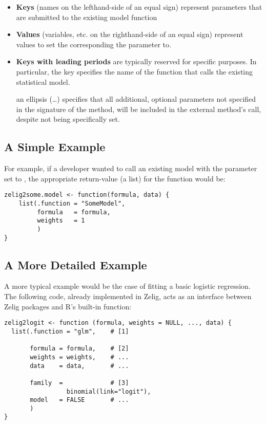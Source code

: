 \begin{itemize}

  \item {\bf Keys} (names on the lefthand-side of an equal sign) represent
        parameters that are submitted to the existing model function

  \item {\bf Values} (variables, etc. on the righthand-side of an equal sign)
        represent values to set the corresponding the parameter to.
        
  \item {\bf Keys with leading periods} are typically reserved for specific
         purposes. In particular, the key 
        specifies the name of the function that calls the existing statistical
        model.
	\item[an ellipsis (\dots)] specifies that all additional, optional parameters not specified in the signature of the  method, will be included in the external method's call, despite not being specifically set.


\end{itemize}

\subsection{A Simple Example}

\noindent For example, if a developer wanted to call an existing model
 with the parameter  set to ,
the appropriate return-value (a list) for the  function would be:


\begin{verbatim}
zelig2some.model <- function(formula, data) {
    list(.function = "SomeModel",
         formula   = formula,
         weights   = 1
         )
}
\end{verbatim}


\subsection{A More Detailed Example}

\noindent A more typical example would be the case of fitting a basic logistic
regression. The following code, already implemented in Zelig, acts as an
interface between Zelig packages and R's built-in  function:


\begin{verbatim}
zelig2logit <- function (formula, weights = NULL, ..., data) {
  list(.function = "glm",    # [1]
       
       formula = formula,    # [2]
       weights = weights,    # ...
       data    = data,       # ...

       family  =             # [3]
                 binomial(link="logit"),
       model   = FALSE       # ...
       )
}
\end{verbatim}

